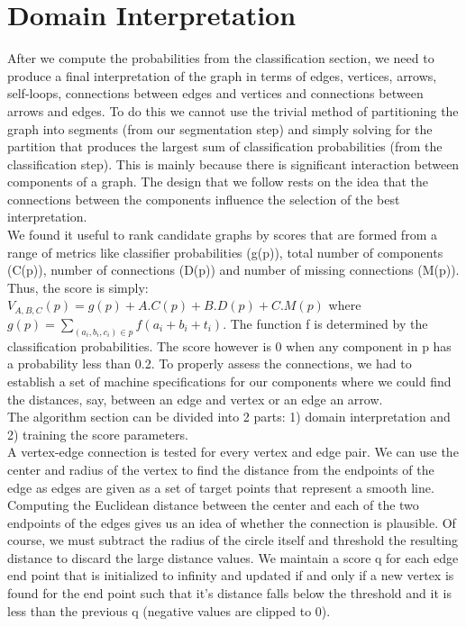 \section{Domain Interpretation}
\label{sec:interpretation}
After we compute the probabilities from the classification section, we need to produce a final interpretation of the graph in terms of edges, vertices, arrows, self-loops, connections between edges and vertices and connections between arrows and edges. To do this we cannot use the trivial method of partitioning the graph into segments (from our segmentation step) and simply solving for the partition that produces the largest sum of classification probabilities (from the classification step). This is mainly because there is significant interaction between components of a graph. The design that we follow rests on the idea that the connections between the components influence the selection of the best interpretation.\\

We found it useful to rank candidate graphs by scores that are formed from a range of metrics like classifier probabilities (g(p)), total number of components (C(p)), number of connections (D(p)) and number of missing connections (M(p)). Thus, the score is simply: $V_{A,B,C}(p) = g(p) + A.C(p) + B.D(p) + C.M(p)$ where $g(p) = \sum_{(a_i,b_i,c_i) \in p}f(a_i+b_i+t_i)$. The function f is determined by the classification probabilities. The score however is 0 when any component in p has a probability less than 0.2. To properly assess the connections, we had to establish a set of machine specifications for our components where we could find the distances, say, between an edge and vertex or an edge an arrow.\\

The algorithm section can be divided into 2 parts: 1) domain interpretation and 2) training the score parameters.\\

A vertex-edge connection is tested for every vertex and edge pair. We can use the center and radius of the vertex to find the distance from the endpoints of the edge as edges are given as a set of target points that represent a smooth line. Computing the Euclidean distance between the center and each of the two endpoints of the edges gives us an idea of whether the connection is plausible. Of course, we must subtract the radius of the circle itself and threshold the resulting distance to discard the large distance values. We maintain a score q for each edge end point that is initialized to infinity and updated if and only if a new vertex is found for the end point such that it's distance falls below the threshold and it is less than the previous q (negative values are clipped to 0).\\

